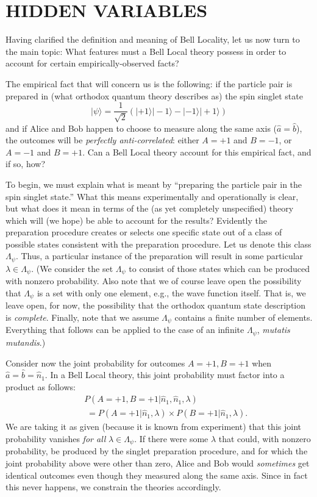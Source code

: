 \documentclass[aps,prc,onecolumn,12pt,nofootinbib]{revtex4-2}
\begin{document}
\section{HIDDEN VARIABLES}
\label{sec3}

Having clarified the definition and meaning of Bell Locality, let us
now turn to the main topic:  What features must a Bell Local theory
possess in order to account for certain empirically-observed facts?

The empirical fact that will concern us is the following:  if the
particle pair is prepared in (what orthodox quantum theory describes as)
the spin singlet state
\begin{equation}
|\psi\rangle = \frac{1}{\sqrt{2}} \left( |+1\rangle |-1\rangle -
 |-1\rangle |+1\rangle \right)
\end{equation}
and if Alice and Bob happen to choose to measure along the same axis
($\hat{a}=\hat{b}$), the outcomes will be \emph{perfectly anti-correlated}:
either $A = +1$ and $B=-1$, or $A=-1$ and $B=+1$.  Can a Bell Local
theory account for this empirical fact, and if so, how?

To begin, we must explain what is meant by ``preparing the particle
pair in the spin singlet state.''  What this means experimentally and
operationally is clear, but what does it mean in terms of the (as yet
completely unspecified) theory which will (we hope) be able
to account for the results?
Evidently the preparation procedure creates or selects one specific
state out of a class of possible states consistent with the
preparation procedure.  Let us denote this class $ \Lambda_\psi $.
Thus, a particular instance of the preparation will result in
some particular  $\lambda  \in  \Lambda_\psi $.
(We consider the set $\Lambda_\psi$ to consist of those
states which can be produced with nonzero probability.  Also note that
we of course leave open the possibility that $\Lambda_\psi$
is a set with only one element, e.g., the wave function itself.
That is, we leave open, for now, the possibility that the
orthodox quantum state description is \emph{complete}.  Finally, note
that we assume $\Lambda_\psi$ contains a finite number of elements.
Everything that follows can be applied to the case of an infinite
$\Lambda_\psi$, \emph{mutatis mutandis}.)

Consider now the joint probability for outcomes $A=+1, B=+1$ when
$\hat{a} = \hat{b} = \hat{n}_1$.  In a Bell Local
theory, this joint probability must factor into a product as follows:
\begin{eqnarray}
&&P(A=+1,B=+1 | \hat{n}_1,\hat{n}_1, \lambda) \nonumber \\
&& \; = P(A=+1 | \hat{n}_1,\lambda)
\times P(B=+1 | \hat{n}_1,\lambda).
\end{eqnarray}
We are taking it as given (because it is known from experiment)
that this joint probability vanishes \emph{for
all} $\lambda \in \Lambda_\psi $.  If there were some $\lambda$ that
could, with nonzero probability, be produced by the singlet preparation
procedure, and for which the joint probability above were other than
zero, Alice and Bob would \emph{sometimes} get identical outcomes
even though they measured along the same axis.  Since in fact this
never happens, we constrain the theories accordingly.
\end{document}
